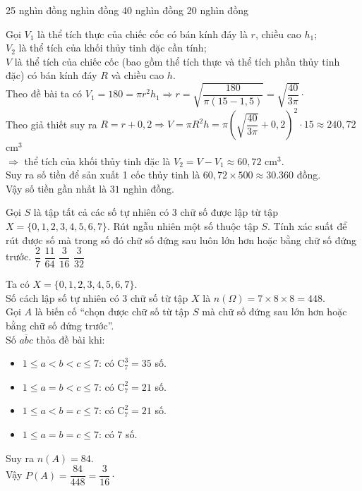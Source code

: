 \begin{ex}
	\choice
	{25 nghìn đồng}
	{ nghìn đồng}
	{40 nghìn đồng}
	{20 nghìn đồng}
	\loigiai
	{Gọi $ V_1 $ là thể tích thực của chiếc cốc có bán kính đáy là $ r $, chiều cao $ h_1 $;\\ $ V_2 $ là thể tích của khối thủy tinh đặc cần tính;\\
			$ V $ là thể tích của chiếc cốc (bao gồm thể tích thực và thể tích phần thủy tinh đặc) có bán kính đáy $ R $ và chiều cao $ h $.\\
			Theo đề bài ta có $ V_1 = 180 = \pi r^2 h_1 \Rightarrow r = \sqrt{\dfrac{180}{\pi (15-1,5)}} = \sqrt{\dfrac{40}{3 \pi }} \cdot $\\
			Theo giả thiết suy ra $ R = r + 0,2 \Rightarrow V = \pi R^2 h = \pi \left(\sqrt{\dfrac{40}{3 \pi }}+0,2\right)^2 \cdot 15 \approx 240{,}72 $ cm$ ^3 $\\
			$ \Rightarrow $  thể tích của khối thủy tinh đặc là $ V_{2} = V - V_1 \approx 60,72 $ cm$ ^3 $.\\
			Suy ra số tiền để sản xuất 1 cốc thủy tinh là $ 60{,}72 \times 500 \approx 30{.}360 $ đồng.\\
			Vậy số tiền gần nhất là $ 31 $ nghìn đồng.
			
	}
\end{ex}
\begin{ex}%
Gọi $ S $ là tập tất cả các số tự nhiên có $ 3 $  chữ số được lập từ tập $ X = \{0,1,2,3,4,5,6,7\} $. Rút ngẫu nhiên một số thuộc tập $ S $. Tính xác suất để rút được số mà trong số đó chữ số đứng sau luôn lớn hơn hoặc bằng chữ số đứng trước.
	\choice
	{$ \dfrac{2}{7} $}
	{$ \dfrac{11}{64} $}
	{\True $ \dfrac{3}{16} $}
	{$ \dfrac{3}{32} $}
	\loigiai
	{
	Ta có $ X = \{0,1,2,3,4,5,6,7\} $.\\
	Số cách lập số tự nhiên có $ 3 $  chữ số từ tập $X$	là $ n(\Omega) = 7 \times 8 \times 8  = 448$.\\
	Gọi $ A $ là biến cố ``chọn được chữ số từ tập $ S $ mà chữ số đứng sau lớn hơn hoặc bằng chữ số đứng trước''.\\
	Số $ \overline{abc} $ thỏa đề bài khi:
	\begin{itemize}
		\item $ 1 \leq a < b < c \leq 7 $: có $ \mathrm{C}_7^3 = 35 $ số.
		\item $ 1 \leq a = b < c \leq 7 $: có $ \mathrm{C}_7^2 = 21 $ số.
		\item $ 1 \leq a < b = c \leq 7 $: có $ \mathrm{C}_7^2 = 21 $ số.
		\item $ 1 \leq a = b = c \leq 7 $: có $7$ số.
	\end{itemize}
Suy ra $ n(A) = 84 $.\\
Vậy $ P(A) = \dfrac{84}{448} = \dfrac{3}{16} \cdot  $
	}
\end{ex}
